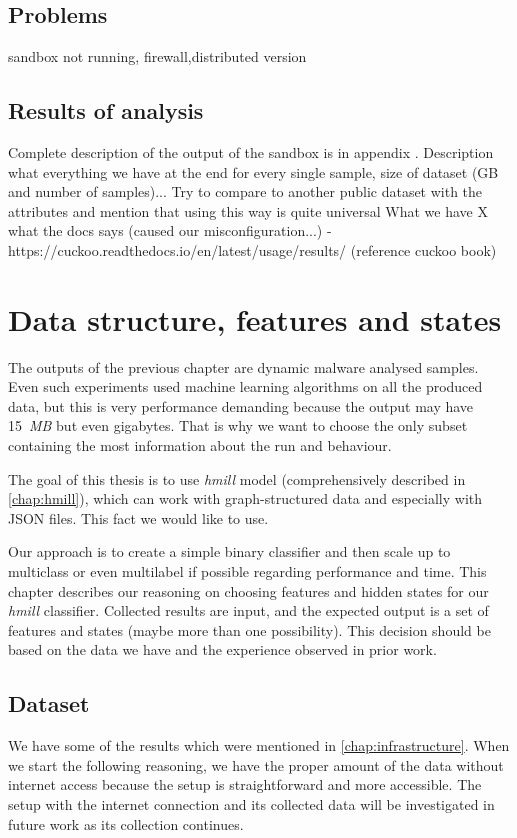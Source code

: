 \section{Problems}
sandbox not running, firewall,distributed version

\section{Results of analysis}
Complete description of the output of the sandbox is in appendix .
Description what everything we have at the end for every single sample, size of dataset (GB and number of samples)...
Try to compare to another public dataset with the attributes and mention that using this way is quite universal
What we have X what the docs says (caused our misconfiguration...) - https://cuckoo.readthedocs.io/en/latest/usage/results/ (reference cuckoo book)

\chapter{Data structure, features and states} \label{chap:data}
The outputs of the previous chapter are dynamic malware analysed samples. Even such experiments used machine learning algorithms on all the produced data, but this is very performance demanding because the output may have 15~\emph{MB} but even gigabytes. That is why we want to choose the only subset containing the most information about the run and behaviour. 

The goal of this thesis is to use \emph{hmill} model (comprehensively described in \ref{chap:hmill}), which can work with graph-structured data and especially with JSON files. This fact we would like to use.

Our approach is to create a simple binary classifier and then scale up to multiclass or even multilabel if possible regarding performance and time. This chapter describes our reasoning on choosing features and hidden states for our \emph{hmill} classifier.  Collected results are input, and the expected output is a set of features and states (maybe more than one possibility). This decision should be based on the data we have and the experience observed in prior work.


\section{Dataset}
We have some of the results which were mentioned in \ref{chap:infrastructure}. When we start the following reasoning, we have the proper amount of the data without internet access because the setup is straightforward and more accessible. The setup with the internet connection and its collected data will be investigated in future work as its collection continues. 

